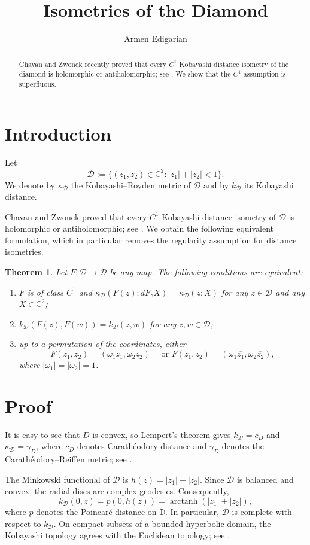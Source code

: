 \documentclass[12pt]{amsart}
\title{Isometries of the Diamond}
\author{Armen Edigarian}
\newtheorem{theorem}{Theorem}[section]
\newcommand{\D}{\mathcal D}
\newcommand{\C}{\mathbb C}
\newcommand{\kD}{k_{\D}}
\newcommand{\kapD}{\kappa_{\D}}
\begin{document}
\begin{abstract}
Chavan and Zwonek recently proved that every $C^1$ Kobayashi distance
isometry of the diamond is holomorphic or antiholomorphic; see \cite{CZ}.
We show that the $C^1$ assumption is superfluous.
\end{abstract}

\maketitle

\section{Introduction}

Let
\[
\D:=\{(z_1,z_2)\in\C^2: |z_1|+|z_2|<1\}.
\]
We denote by $\kapD$ the Kobayashi--Royden metric of $\D$ and by $\kD$
its Kobayashi distance.

Chavan and Zwonek proved that every $C^1$ Kobayashi distance isometry
of $\D$ is holomorphic or antiholomorphic; see \cite{CZ}. We obtain the
following equivalent formulation, which in particular removes the
regularity assumption for distance isometries.

\begin{theorem}\label{thm:KR}
Let $F:\D\to\D$ be any map. The following conditions are equivalent:
\begin{enumerate}
\item $F$ is of class $C^1$ and
$\kapD(F(z);dF_zX)=\kapD(z;X)$ for any $z\in\D$ and any $X\in\C^2$;
\item $\kD(F(z),F(w))=\kD(z,w)$ for any $z,w\in\D$;
\item up to a permutation of the coordinates, either
\[
F(z_1,z_2)=(\omega_1z_1,\omega_2z_2)
\quad\text{ or }
F(z_1,z_2)=(\omega_1\overline{z_1},\omega_2\overline{z_2}),
\]
where $|\omega_1|=|\omega_2|=1$.
\end{enumerate}
\end{theorem}

\section{Proof}
It is easy to see that $D$ is convex, so Lempert’s theorem gives 
$\kD=c_D$ and $\kapD=\gamma_D$, where $c_D$ denotes Carath\'eodory distance and $\gamma_D$ denotes the Carath\'eodory–Reiffen metric; see \cite{JP, Lempert}.

The Minkowski functional of $\D$ is $h(z)=|z_1|+|z_2|$.
Since $\D$ is balanced and convex, the radial discs are complex
geodesics. Consequently,
\begin{equation}\label{eq:radial}
\kD(0,z)
=
p(0,h(z))
=
\operatorname{arctanh}(|z_1|+|z_2|),
\end{equation}
where $p$ denotes the Poincar\'e distance on $\mathbb D$.
In particular, $\D$ is complete with respect to $\kD$. On compact subsets of a bounded
hyperbolic domain, the Kobayashi topology agrees with the Euclidean
topology; see \cite[Proposition 2.6.1]{JP}.
\end{document}
